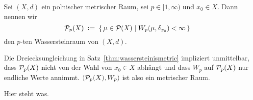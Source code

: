 \documentclass[../main/main.tex]{subfiles}
\begin{document}
	\begin{Definition}[Wassersteinraum]
		\label{def:wassersteinspace}
		Sei $(X, d)$ ein polnischer metrischer Raum, sei $p \in [1, \infty)$ und $x_0 \in X$. Dann nennen wir
		\[ \mathcal{P}_{p}(X) \; \vcentcolon = \; \left\{\, \mu \in \mathcal{P}(X) \; \middle| \; W_p(\mu, \delta_{x_0}) < \infty \,\right\} \]
		den $p$-ten Wassersteinraum von $(X, d)$.
	\end{Definition}

	\begin{Bemerkung}
		Die Dreiecksungleichung in Satz~\ref{thm:wassersteinismetric} impliziert unmittelbar, dass $\mathcal{P}_{p}(X)$ nicht von der Wahl von $x_0 \in X$ abhängt 
		und dass $W_p$ auf $\mathcal{P}_{p}(X)$ nur endliche Werte annimmt. $(\mathcal{P}_{p}(X), W_p)$ ist also ein metrischer Raum.
	\end{Bemerkung}

	\begin{Definition}
		Hier steht was.
	\end{Definition}
	
\end{document}
